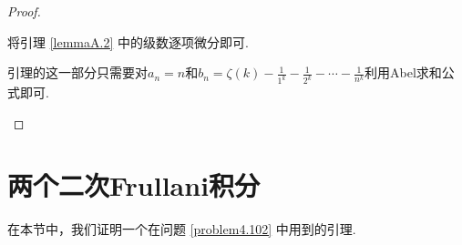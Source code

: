 \begin{proof}
  \begin{inparaenum}[(a)]
    \item 将引理 \ref{lemmaA.2} 中的级数逐项微分即可.

    \item 引理的这一部分只需要对$a_n=n$和$b_n=\zeta(k)-\frac1{1^k}-\frac1{2^k}
        -\cdots-\frac1{n^k}$利用Abel求和公式即可.
  \end{inparaenum}
\end{proof}

\section{两个二次Frullani积分}
在本节中，我们证明一个在问题 \ref{problem4.102} 中用到的引理.

